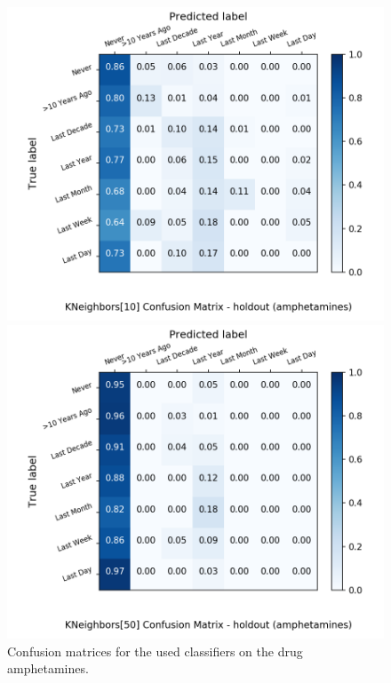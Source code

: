 \begin{figure}[H]
\begin{minipage}[b]{0.32\textwidth}
		\includegraphics[width=1.1\textwidth]{Plots/amphetamines_KNeighbors_10_balance_False_holdout.png}
  \end{minipage}
	\begin{minipage}[b]{0.32\textwidth}
		\includegraphics[width=1.1\textwidth]{Plots/amphetamines_KNeighbors_50_balance_False_holdout.png}
  \end{minipage}
	\caption{Confusion matrices for the used classifiers on the drug amphetamines.}
\end{figure}

